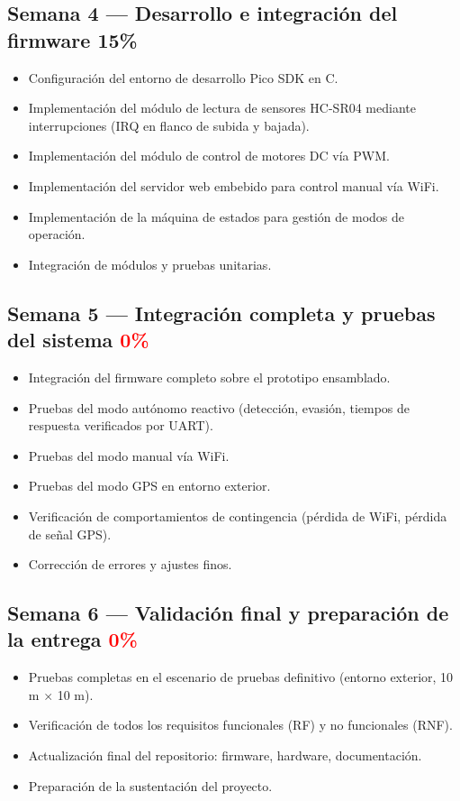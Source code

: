 \documentclass[12pt]{report}
\begin{document}
\subsection*{Semana 4 — Desarrollo e integración del firmware \hfill \textcolor{orange!80!red}{15\%}}

\begin{itemize}
    \item Configuración del entorno de desarrollo Pico SDK en C.
    \item Implementación del módulo de lectura de sensores HC-SR04 mediante interrupciones (IRQ en flanco de subida y bajada).
    \item Implementación del módulo de control de motores DC vía PWM.
    \item Implementación del servidor web embebido para control manual vía WiFi.
    \item Implementación de la máquina de estados para gestión de modos de operación.
    \item Integración de módulos y pruebas unitarias.
\end{itemize}

\subsection*{Semana 5 — Integración completa y pruebas del sistema \hfill \textcolor{red}{0\%}}

\begin{itemize}
    \item Integración del firmware completo sobre el prototipo ensamblado.
    \item Pruebas del modo autónomo reactivo (detección, evasión, tiempos de respuesta verificados por UART).
    \item Pruebas del modo manual vía WiFi.
    \item Pruebas del modo GPS en entorno exterior.
    \item Verificación de comportamientos de contingencia (pérdida de WiFi, pérdida de señal GPS).
    \item Corrección de errores y ajustes finos.
\end{itemize}

\subsection*{Semana 6 — Validación final y preparación de la entrega \hfill \textcolor{red}{0\%}}

\begin{itemize}
    \item Pruebas completas en el escenario de pruebas definitivo (entorno exterior, 10 m $\times$ 10 m).
    \item Verificación de todos los requisitos funcionales (RF) y no funcionales (RNF).
    \item Actualización final del repositorio: firmware, hardware, documentación.
    \item Preparación de la sustentación del proyecto.
\end{itemize}
\end{document}
